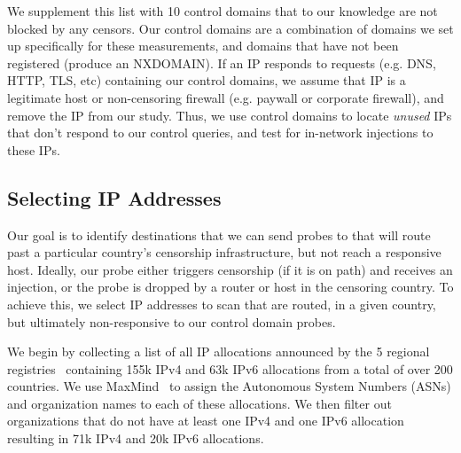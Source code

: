 We supplement this list with 10 control domains that to our knowledge are not
blocked by any censors. Our control domains are a combination of domains we set up
specifically for these measurements, and domains that have not been registered
(produce an NXDOMAIN).
If an IP responds to requests (e.g. DNS, HTTP,
TLS, etc) containing our control domains, we assume that IP is a legitimate host
or non-censoring firewall (e.g. paywall or corporate firewall), and remove the
IP from our study. Thus, we use control domains to locate \emph{unused} IPs that
don't respond to our control queries, and test for in-network injections to
these IPs.


\subsection{Selecting IP Addresses}
\label{subsec:selecting-ips}

\FigAllocSize

Our goal is to identify destinations that we can send probes to that will route
past a particular country's censorship infrastructure, but not reach a
responsive host. Ideally, our probe either triggers censorship (if it is on path) and
receives an injection, or the probe is dropped by a router or host in the censoring
country. To achieve this, we select IP addresses to scan that are routed, in a
given country, but ultimately
non-responsive to our control domain probes.

%

We begin by collecting a list of all IP allocations announced by the 5 regional
registries~\cite{herrbisc56:online} containing 155k IPv4 and
63k IPv6 allocations from a total of over 200 countries. We use
MaxMind~\cite{IPGeoloc87:online} to assign the Autonomous System Numbers (ASNs)
and organization names to each of these allocations. We then filter out
organizations that do not have at least one IPv4 and one IPv6 allocation
resulting in 71k IPv4 and 20k IPv6 allocations.

